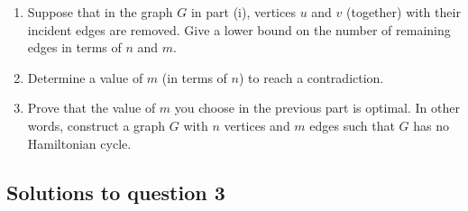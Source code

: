 \documentclass{article}
\begin{document}
\begin{enumerate}[label=(\alph*)]
\begin{enumerate}[label=(\roman*)]
              \item Suppose that in the graph $G$ in part (i), vertices $u$ and $v$ (together) with their incident edges are removed. Give a lower bound on the number of remaining edges in terms of $n$ and $m$.

              \item Determine a value of $m$ (in terms of $n$) to reach a contradiction.

              \item Prove that the value of $m$ you choose in the previous part is optimal. In other words, construct a graph $G$ with $n$ vertices and $m$ edges such that $G$ has no Hamiltonian cycle.
          \end{enumerate}
\end{enumerate}

\subsection*{Solutions to question 3}
\end{document}
